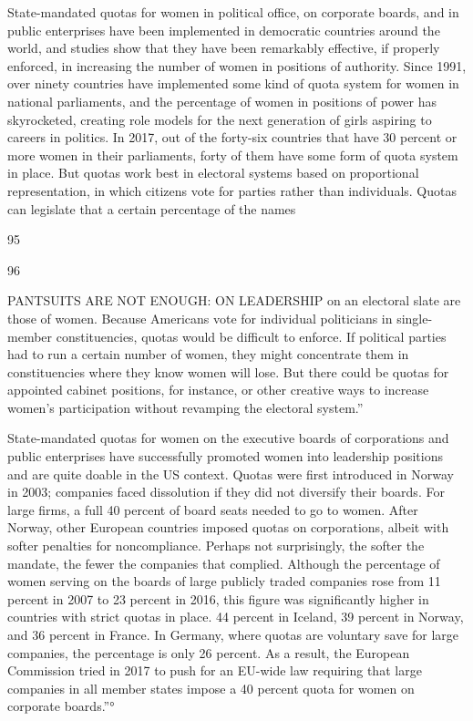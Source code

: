  \par 
State-mandated quotas for women in political office, on corporate boards, and in public enterprises have been implemented in democratic countries around the world, and studies show that they have been remarkably effective, if properly enforced, in increasing the number of women in positions of authority. Since 1991, over ninety countries have implemented some kind of quota system for women in national parliaments, and the percentage of women in positions of power has skyrocketed, creating role models for the next generation of girls aspiring to careers in politics. In 2017, out of the forty-six countries that have {\color{blue}30} percent or more women in their parliaments, forty of them have some form of quota system in place. But quotas work best in electoral systems based on proportional representation, in which citizens vote for parties rather than individuals. Quotas can legislate that a certain percentage of the names
 \par 
95
 \par 
96
 \par 
PANTSUITS ARE NOT ENOUGH: ON LEADERSHIP on an electoral slate are those of women. Because Americans vote for individual politicians in single-member constituencies, quotas would be difficult to enforce. If political parties had to run a certain number of women, they might concentrate them in constituencies where they know women will lose. But there could be quotas for appointed cabinet positions, for instance, or other creative ways to increase women’s participation without revamping the electoral system.”
 \par 
State-mandated quotas for women on the executive boards of corporations and public enterprises have successfully promoted women into leadership positions and are quite doable in the US context. Quotas were first introduced in Norway in 2003; companies faced dissolution if they did not diversify their boards. For large firms, a full {\color{blue}40} percent of board seats needed to go to women. After Norway, other European countries imposed quotas on corporations, albeit with softer penalties for noncompliance. Perhaps not surprisingly, the softer the mandate, the fewer the companies that complied. Although the percentage of women serving on the boards of large publicly traded companies rose from {\color{blue}11} percent in 2007 to {\color{blue}23} percent in 2016, this figure was significantly higher in countries with strict quotas in place. {\color{blue}44} percent in Iceland, {\color{blue}39} percent in Norway, and {\color{blue}36} percent in France. In Germany, where quotas are voluntary save for large companies, the percentage is only {\color{blue}26} percent. As a result, the European Commission tried in 2017 to push for an EU-wide law requiring that large companies in all member states impose a {\color{blue}40} percent quota for women on corporate boards.”°
